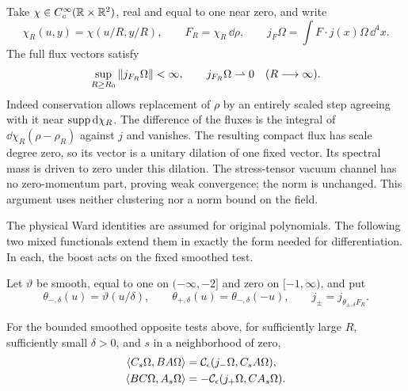Take $\chi\in C_c^\infty(\mathbb R\times\mathbb R^2)$, real and equal to one near
zero, and write
\[
 \chi_R(u,y)=\chi(u/R,y/R),\qquad F_R=\chi_R\,\dd\rho,
 \qquad j_F\Omega=\int F\mathbin{\cdot}j(x)\Omega\,\dd^4x.
\]
The full flux vectors satisfy
\begin{equation}\label{N:full-flux}
 \sup_{R\geq R_0}\left\lVert j_{F_R}\Omega\right\rVert<\infty,
 \qquad j_{F_R}\Omega\rightharpoonup0\quad(R\longrightarrow\infty).
\end{equation}
Indeed conservation allows replacement of $\rho$ by an entirely scaled
step agreeing with it near $\operatorname{supp}\mathrm d\chi_R$.  The difference of the
fluxes is the integral of $\dd\chi_R(\rho-\rho_R)$ against $j$ and
vanishes.  The resulting compact flux has scale degree zero, so its
vector is a unitary dilation of one fixed vector.  Its spectral mass
is driven to zero under this dilation.  The stress-tensor vacuum
channel has no zero-momentum part, proving weak convergence; the norm
is unchanged.  This argument uses neither clustering nor a norm bound
on the field.

The physical Ward identities are assumed for original polynomials.
The following two mixed functionals extend them in exactly the form
needed for differentiation. In each, the boost acts on the fixed
smoothed test.

Let $\vartheta$ be smooth, equal to one on $(-\infty,-2]$ and zero on
$[-1,\infty)$, and put
\[
 \theta_{-,\delta}(u)=\vartheta(u/\delta),\qquad
 \theta_{+,\delta}(u)=\theta_{-,\delta}(-u),\qquad
 j_\pm=j_{\theta_{\pm,\delta}F_R}.
\]

\begin{lemma}\label{N:mixed-Ward}
For the bounded smoothed opposite tests above, for sufficiently large
$R$, sufficiently small $\delta>0$, and $s$ in a neighborhood of zero,
\begin{align}\label{N:undifferentiated-Ward}
 \left\langle C_s\Omega,BA\Omega\right\rangle
   &=\mathcal C_\epsilon(j_-\Omega,C_sA\Omega),\notag\\
 \left\langle BC\Omega,A_s\Omega\right\rangle
   &=-\mathcal C_\epsilon(j_+\Omega,CA_s\Omega).
\end{align}
\end{lemma}

